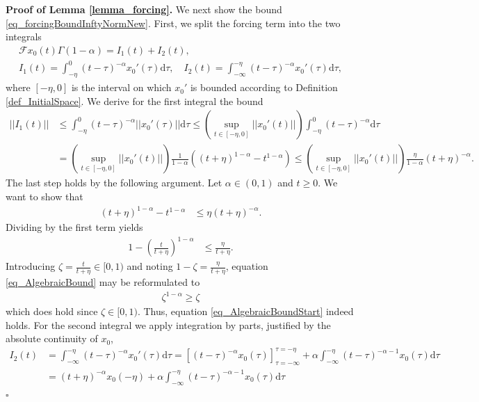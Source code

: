 \documentclass{svproc}
\renewenvironment{proof}[1][Proof]{\par\noindent\textbf{#1.} }{\hfill$\square$\par\vspace{1em}}
\newcommand{\dsomething}[1]{\mathrm{d}#1}
\begin{document}
\begin{proof}[Proof of Lemma \ref{lemma_forcing}]
    We next show the bound \eqref{eq_forcingBoundInftyNormNew}. First, we split the forcing term into the two integrals
	\begin{align}
		\mathcal Fx_0(t)\Gamma(1-\alpha) = I_1(t)+I_2(t),\\
		I_1(t)=\int_{-\eta}^{0}(t-\tau)^{-\alpha}x_0'(\tau)\dsomething{\tau},\quad I_2(t)=\int_{-\infty}^{-\eta}(t-\tau)^{-\alpha}x_0'(\tau)\dsomething{\tau},
	\end{align} where $[-\eta,0]$ is the interval on which $x_0'$ is bounded according to Definition \ref{def_InitialSpace}. We derive for the first integral the bound
	\begin{align}
		||I_1(t)||&\leq \int_{-\eta}^{0}(t-\tau)^{-\alpha}||x_0'(\tau)||\dsomething{\tau}
		\leq \left(\sup_{t\in [-\eta,0]}||x_0'(t)||\right)\int_{-\eta}^{0}(t-\tau)^{-\alpha}\dsomething{\tau}\\
		&=  \left(\sup_{t\in [-\eta,0]}||x_0'(t)||\right) \frac{1}{1-\alpha}\left((t+\eta)^{1-\alpha}-t^{1-\alpha}\right)
		\leq  \left(\sup_{t\in [-\eta,0]}||x_0'(t)||\right) \frac{\eta}{1-\alpha}(t+\eta)^{-\alpha}.\label{eq_I1bound}
	\end{align}
	The last step holds by the following argument. Let $\alpha\in(0,1)$ and $t\geq 0$. We want to show that
	\begin{align}
		(t+\eta)^{1-\alpha}-t^{1-\alpha}&\leq \eta(t+\eta)^{-\alpha}.\label{eq_AlgebraicBoundStart}
	\end{align}Dividing by the first term yields
	\begin{align}
		1-\left(\frac{t}{t+\eta}\right)^{1-\alpha} &\leq \frac{\eta}{t+\eta}. \label{eq_AlgebraicBound}
	\end{align} Introducing $\zeta = \frac{t}{t+\eta}\in [0,1)$ and noting $1-\zeta = \frac{\eta}{t+\eta}$, equation \eqref{eq_AlgebraicBound} may be reformulated to
	\begin{align}
		\zeta^{1-\alpha} \geq \zeta
	\end{align}which does hold since $\zeta\in[0,1)$. Thus, equation \eqref{eq_AlgebraicBoundStart} indeed holds. For the second integral we apply  integration by parts{, justified by the absolute continuity of $x_0$}, 
	\begin{align}\label{eq_intByParts}
		I_2(t) &= \int_{-\infty}^{-\eta}(t-\tau)^{-\alpha}x_0'(\tau)\dsomething{\tau}= \left[(t-\tau)^{-\alpha} x_0(\tau)\right]^{\tau = -\eta}_{\tau = -\infty}+\alpha\int_{-\infty}^{-\eta}(t-\tau)^{-\alpha-1}x_0(\tau)\dsomething{\tau}\\&= (t+\eta)^{-\alpha}x_0(-\eta)+\alpha\int_{-\infty}^{-\eta}(t-\tau)^{-\alpha-1}x_0(\tau)\dsomething{\tau}\label{eq_I2BoundIntermediate}

\end{align}
\end{proof}
\end{document}
